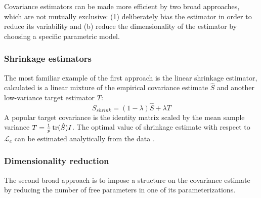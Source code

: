 Covariance estimators can be made more efficient by two broad approaches, which are not mutually exclusive: (1) deliberately bias the estimator in order to reduce its variability and (b) reduce the dimensionality of the estimator by choosing a specific parametric model. 

\subsubsection*{Shrinkage estimators}
The most familiar example of the first approach is the linear shrinkage estimator, calculated is a linear mixture of the empirical covariance estimate $\hat S$ and another low-variance target estimator $T$:
\begin{equation}
S_{shrink} = (1-\lambda) \hat S + \lambda T
\end{equation}
A popular target covariance is the identity matrix scaled by the mean sample variance  $T = \frac 1 p \operatorname{tr}(\hat S) I$.
The optimal value of shrinkage estimate with respect to $\mathcal L_e$ can be estimated analytically from the data \citep{Ledoit:2004,Schafer:2005}.  

\subsubsection*{Dimensionality reduction}
The second broad approach is to impose a structure on the covariance estimate by reducing the number of free parameters in one of its parameterizations. 